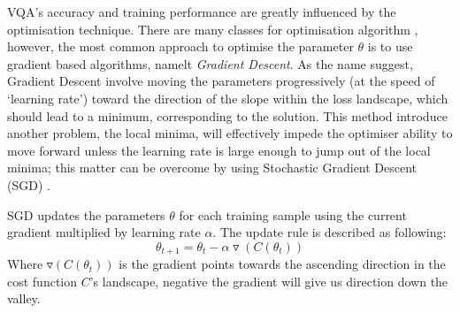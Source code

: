VQA's accuracy and training performance are greatly influenced by the optimisation technique.
There are many classes for optimisation algorithm \cite{zaheerStudyOptimizationAlgorithms2019a}, however, the most common approach to optimise the parameter $\theta$ is to use gradient based algorithms, namelt \emph{Gradient Descent}.
As the name suggest, Gradient Descent involve moving the parameters progressively (at the speed of `learning rate') toward the direction of the slope within the loss landscape, which should lead to a minimum, corresponding to the solution.
This method introduce another problem, the local minima, will effectively impede the optimiser ability to move forward unless the learning rate is large enough to jump out of the local minima; this matter can be overcome by using Stochastic Gradient Descent (SGD) \cite{ruderOverviewGradientDescent2017}.

SGD updates the parameters $\theta$ for each training sample using the current gradient multiplied by learning rate $\alpha$.
The update rule is described as following:
\begin{equation}
    \theta_{t+1} = \theta_t - \alpha \triangledown(C(\theta_t))
    \label{Eqn: SGD update rule}
\end{equation}
Where $\triangledown(C(\theta_t))$ is the gradient points towards the ascending direction in the cost function $C$'s landscape, negative the gradient will give us direction down the valley.
